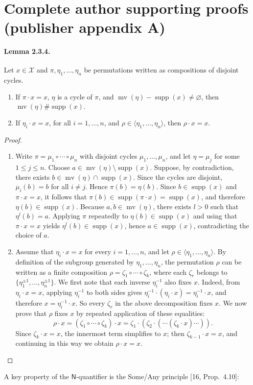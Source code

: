 \section*{Complete author supporting proofs (publisher appendix A)}
\paragraph{Lemma 2.3.4.} Let $x\in\mathcal X$ and $\pi,\eta_1,\ldots,\eta_n$ be permutations written as compositions of disjoint cycles.
\begin{enumerate}
\item If $\pi\cdot x=x$, $\eta$ is a cycle of $\pi$, and $\operatorname{mv}(\eta)-\operatorname{supp}(x)\ne\varnothing$, then $\operatorname{mv}(\eta)\#\operatorname{supp}(x)$.
\item If $\eta_i\cdot x=x$, for all $i=1,\ldots,n$, and $\rho\in\langle\eta_1,\ldots,\eta_n\rangle$, then $\rho\cdot x=x$.
\end{enumerate}
\begin{proof}
\begin{enumerate}
\item Write $\pi=\mu_1\circ\cdots\circ\mu_n$ with disjoint cycles $\mu_1,\ldots,\mu_n$, and let $\eta=\mu_j$ for some $1\le j\le n$. Choose $a\in\operatorname{mv}(\eta)\setminus\operatorname{supp}(x)$.
Suppose, by contradiction, there exists $b\in\operatorname{mv}(\eta)\cap\operatorname{supp}(x)$.
Since the cycles are disjoint, $\mu_i(b)=b$ for all $i\ne j$. Hence $\pi(b)=\eta(b)$.
Since $b\in\operatorname{supp}(x)$ and $\pi\cdot x=x$, it follows that $\pi(b)\in\operatorname{supp}(\pi\cdot x)=\operatorname{supp}(x)$, and therefore $\eta(b)\in\operatorname{supp}(x)$.
Because $a,b\in\operatorname{mv}(\eta)$, there exists $l>0$ such that $\eta^l(b)=a$.
Applying $\pi$ repeatedly to $\eta(b)\in\operatorname{supp}(x)$ and using that $\pi\cdot x=x$ yields $\eta^l(b)\in\operatorname{supp}(x)$, hence $a\in\operatorname{supp}(x)$, contradicting the choice of $a$.
\item Assume that $\eta_i\cdot x=x$ for every $i=1,\ldots,n$, and let $\rho\in\langle\eta_1,\ldots,\eta_n\rangle$.
By definition of the subgroup generated by $\eta_1,\ldots,\eta_n$, the permutation $\rho$ can be written as a finite composition $\rho=\zeta_1\circ\cdots\circ\zeta_k$, where each $\zeta_r$ belongs to $\{\eta_1^{\pm1},\ldots,\eta_n^{\pm1}\}$.
We first note that each inverse $\eta_i^{-1}$ also fixes $x$.
Indeed, from $\eta_i\cdot x=x$, applying $\eta_i^{-1}$ to both sides gives $\eta_i^{-1}\cdot(\eta_i\cdot x)=\eta_i^{-1}\cdot x$, and therefore $x=\eta_i^{-1}\cdot x$.
So every $\zeta_r$ in the above decomposition fixes $x$.
We now prove that $\rho$ fixes $x$ by repeated application of these equalities:
\[
\rho\cdot x=(\zeta_1\circ\cdots\circ\zeta_k)\cdot x=\zeta_1\cdot(\zeta_2\cdot(\cdots(\zeta_k\cdot x)\cdots)).
\]
Since $\zeta_k\cdot x=x$, the innermost term simplifies to $x$; then $\zeta_{k-1}\cdot x=x$, and continuing in this way we obtain $\rho\cdot x=x$.
\end{enumerate}
\end{proof}
A key property of the $\mathsf N$-quantifier is the Some/Any principle [16, Prop.\ 4.10]:

